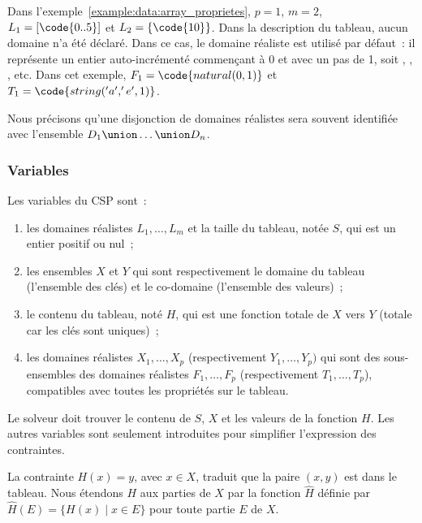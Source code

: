 Dans l'exemple~\ref{example:data:array_proprietes}, $p = 1$, $m = 2$, $L_1 =
[\code{0..5}]$ et $L_2 = \{\code{10}\}$. Dans la description du tableau, aucun
domaine n'a été déclaré. Dans ce cas, le domaine réaliste 
est utilisé par défaut~: il représente un entier auto-incrémenté commençant à 0
et avec un pas de 1, soit , , ,  etc. Dans cet
exemple, $F_1 = \code{natural(0, 1)}$ et $T_1 = \code{string('a', 'e', 1)}$.

Nous précisons qu'une disjonction de domaines réalistes  sera souvent identifiée avec l'ensemble $D_1 \union \dots \union D_n$.

\subsubsection{Variables}

Les variables du CSP sont~:
%
\begin{enumerate}

\item les domaines réalistes $L_1, \dots, L_m$ et la taille du tableau, notée
$S$, qui est un entier positif ou nul~;

\item les ensembles $X$ et $Y$ qui sont respectivement le domaine du tableau
(l'ensemble des clés) et le co-domaine (l'ensemble des valeurs)~;

\item le contenu du tableau, noté $H$, qui est une fonction totale de $X$ vers
$Y$ (totale car les clés sont uniques)~;

\item les domaines réalistes $X_1, \dots, X_p$ (respectivement $Y_1, \dots,
Y_p)$ qui sont des sous-ensembles des domaines réalistes $F_1, \dots, F_p$
(respectivement $T_1, \dots, T_p$), compatibles avec toutes les propriétés sur
le tableau.

\end{enumerate}

Le solveur doit trouver le contenu de $S$, $X$ et les valeurs de la fonction
$H$. Les autres variables sont seulement introduites pour simplifier
l'expression des contraintes.

La contrainte $H(x) = y$, avec $x \in X$, traduit que la paire $(x, y)$ est dans
le tableau. Nous étendons $H$ aux parties de $X$ par la fonction $\hat{H}$
définie par $\hat{H}(E) = \{H(x) \;\vert\; x \in E\}$ pour toute partie $E$ de
$X$.

